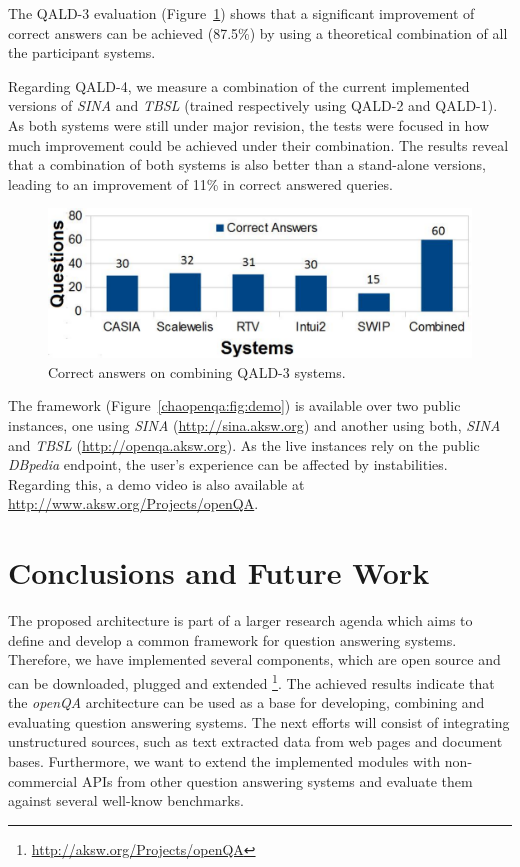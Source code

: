 \vspace{-4.0mm}
The QALD-3 evaluation (Figure~\ref{chaopenqa:fig:combining}) shows that a significant improvement of correct answers can be achieved (87.5\%) by using a theoretical combination of all the participant systems.

Regarding QALD-4, we measure a combination of the current implemented versions of \emph{SINA} and \emph{TBSL} (trained respectively using QALD-2 and QALD-1). 
As both systems were still under major revision, the tests were focused in how much improvement could be achieved under their combination. 
The results reveal that a combination of both systems is also better than a stand-alone versions, leading to an improvement of 11\% in correct answered queries.

\begin{figure}[h]
	\centering
	\includegraphics[width=\columnwidth]{part_03/SEMANTiCS_openQA/images/right_answers.pdf}	
	\caption{Correct answers on combining QALD-3 systems.}
	\label{chaopenqa:fig:combining}
\end{figure}

The framework (Figure~\ref{chaopenqa:fig:demo}) is available over two public instances,
one using \emph{SINA} (\url{http://sina.aksw.org}) and another using both, \emph{SINA} and \emph{TBSL} (\url{http://openqa.aksw.org}).
As the live instances rely on the public \emph{DBpedia} endpoint, the user's experience can be affected by instabilities.
Regarding this, a demo video is also available at \url{http://www.aksw.org/Projects/openQA}.

\vspace{8.0mm}
\section{Conclusions and Future Work}
\label{chaopenqa:sec:conc}

The proposed architecture is part of a larger research agenda which aims to define and develop a common framework for question answering systems.
Therefore, we have implemented several components, which are open source and can be downloaded, plugged and extended \footnote{\url{http://aksw.org/Projects/openQA}}.
The achieved results indicate that the \emph{openQA} architecture can be used as a base for developing, combining and evaluating question answering systems.
The next efforts will consist of integrating unstructured sources, such as text extracted data from web pages and document bases.
Furthermore, we want to extend the implemented modules with non-commercial APIs from other question answering systems and evaluate them against several well-know benchmarks. 

%
%
%
